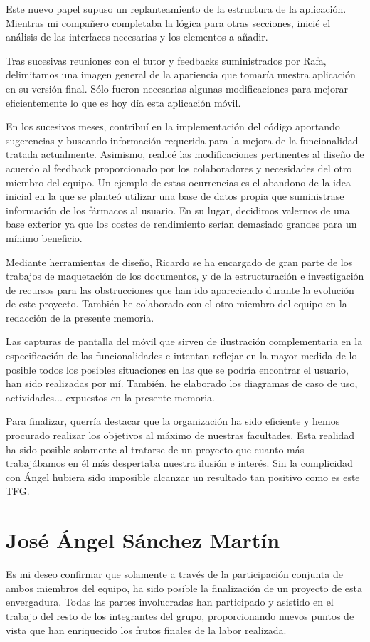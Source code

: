 \documentclass[11pt,spanish,
		listoftables,listoffigures]
		{tfgplantilla}
\begin{document}
Este nuevo papel supuso un replanteamiento de la estructura de la aplicación. Mientras mi compañero completaba la lógica para otras secciones, inicié el análisis de las interfaces necesarias y los elementos a añadir.

Tras sucesivas reuniones con el tutor y feedbacks suministrados por Rafa, delimitamos una imagen general de la apariencia que tomaría nuestra aplicación en su versión final. Sólo fueron necesarias algunas modificaciones para mejorar eficientemente lo que es hoy día esta aplicación móvil.

En los sucesivos meses, contribuí en la implementación del código aportando sugerencias y buscando información requerida para la mejora de la funcionalidad tratada actualmente.
Asimismo, realicé las modificaciones pertinentes al diseño de acuerdo al feedback proporcionado por los colaboradores y necesidades del otro miembro del equipo. Un ejemplo de estas ocurrencias es el abandono de la idea inicial en la que se planteó utilizar una base de datos propia que suministrase información de los fármacos al usuario. En su lugar, decidimos valernos de una base exterior ya que los costes de rendimiento serían demasiado grandes para un mínimo beneficio.

Mediante herramientas de diseño, Ricardo se ha encargado de gran parte de los trabajos de maquetación de los documentos, y de la estructuración e investigación de recursos para las obstrucciones que han ido apareciendo durante la evolución de este proyecto. También he colaborado con el otro miembro del equipo en la redacción de la presente memoria.

Las capturas de pantalla del móvil que sirven de ilustración complementaria en la especificación de las funcionalidades e intentan reflejar en la mayor medida de lo posible todos los posibles situaciones en las que se podría encontrar el usuario, han sido realizadas por mí. También, he elaborado los diagramas de caso de uso, actividades... expuestos en la presente memoria.

Para finalizar, querría destacar que la organización ha sido eficiente y hemos procurado realizar los objetivos al máximo de nuestras facultades. Esta realidad ha sido posible solamente al tratarse de un proyecto que cuanto más trabajábamos en él más despertaba nuestra ilusión e interés. Sin la complicidad con Ángel hubiera sido imposible alcanzar un resultado tan positivo como es este TFG. 
 
\newpage
\section{José Ángel Sánchez Martín}
Es mi deseo confirmar que solamente a través de la participación conjunta de ambos miembros del equipo, ha sido posible la finalización de un proyecto de esta envergadura.
Todas las partes involucradas han participado y asistido en el trabajo del resto de los integrantes del grupo, proporcionando nuevos puntos de vista que han enriquecido los frutos finales de la labor realizada.
\end{document}
